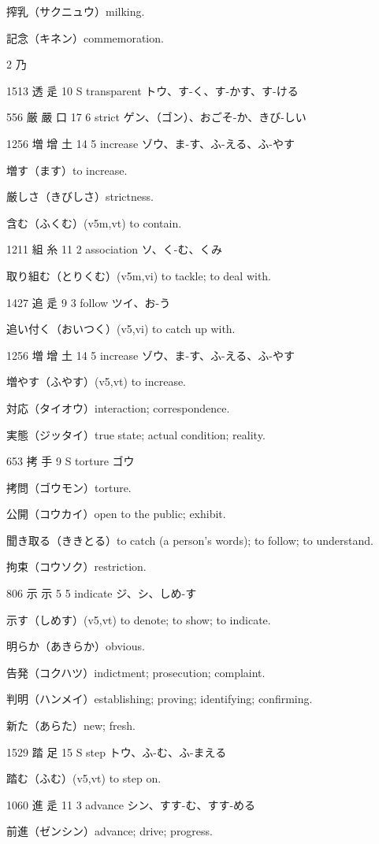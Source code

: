搾乳（サクニュウ）milking.

記念（キネン）commemoration.

2 乃

1513	透		辵	10	S		transparent	トウ、す-く、す-かす、す-ける

556	厳	嚴	口	17	6		strict	ゲン、（ゴン）、おごそ-か、きび-しい

1256	増	增	土	14	5		increase	ゾウ、ま-す、ふ-える、ふ-やす

増す（ます）to increase.

厳しさ（きびしさ）strictness.

含む（ふくむ）(v5m,vt) to contain.

1211	組		糸	11	2		association	ソ、く-む、くみ

取り組む（とりくむ）(v5m,vi) to tackle; to deal with.

1427	追		辵	9	3		follow	ツイ、お-う

追い付く（おいつく）(v5,vi) to catch up with.

1256	増	增	土	14	5		increase	ゾウ、ま-す、ふ-える、ふ-やす

増やす（ふやす）(v5,vt) to increase.

対応（タイオウ）interaction; correspondence.

実態（ジッタイ）true state; actual condition; reality.

653	拷		手	9	S		torture	ゴウ

拷問（ゴウモン）torture.

公開（コウカイ）open to the public; exhibit.

聞き取る（ききとる）to catch (a person's words); to follow; to understand.

拘束（コウソク）restriction.

806	示		示	5	5		indicate	ジ、シ、しめ-す

示す（しめす）(v5,vt) to denote; to show; to indicate.

明らか（あきらか）obvious.

告発（コクハツ）indictment; prosecution; complaint.

判明（ハンメイ）establishing; proving; identifying; confirming.

新た（あらた）new; fresh.

1529	踏		足	15	S		step	トウ、ふ-む、ふ-まえる

踏む（ふむ）(v5,vt) to step on.

1060	進		辵	11	3		advance	シン、すす-む、すす-める

前進（ゼンシン）advance; drive; progress.

